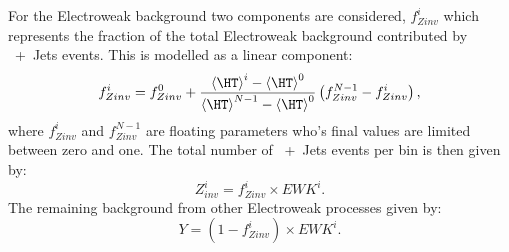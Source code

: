 For the Electroweak background two components are considered, $f^{i}_{Zinv}$ which represents the fraction of the total Electroweak background contributed by \HepProcess{\PZ\to\Pnu\Pnu}~+~Jets events. This is modelled as a linear 
component:
\begin{equation}
  f^{i}_{Zinv} = f^{0}_{Zinv}+\frac{\left<\HT\right>^{i}-\left<\HT\right>^{0}}{\left<\HT\right>^{N-1}-\left<\HT\right>^{0}}\left(f^{N-1}_{Zinv}-f^{i}_{Zinv}\right),
\end{equation}
where $f^{i}_{Zinv}$ and $f^{N-1}_{Zinv}$ are floating parameters who's final values are limited between zero and one. The total number of \HepProcess{\PZ\to\Pnu\Pnu}~+~Jets events per bin is then given by:
\begin{equation}
  Z^{i}_{inv} = f^{i}_{Zinv} \times EWK^{i}.
  \label{eq:fzinv}
\end{equation}
The remaining background from other Electroweak processes given by:
\begin{equation}
  Y=\left(1-f^{i}_{Zinv}\right)\times EWK^{i}.
  \label{eq:noZinv}
\end{equation}

